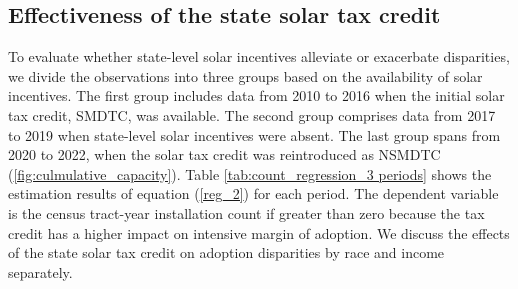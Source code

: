 \documentclass[11pt,twoside,letterpaper]{article}
\begin{document}

\subsection{Effectiveness of the state solar tax credit}

To evaluate whether state-level solar incentives alleviate or exacerbate disparities, we divide the observations into three groups based on the availability of solar incentives. The first group includes data from 2010 to 2016 when the initial solar tax credit, SMDTC, was available. The second group comprises data from 2017 to 2019 when state-level solar incentives were absent. The last group spans from 2020 to 2022, when the solar tax credit was reintroduced as NSMDTC (\autoref{fig:culmulative_capacity}). Table \ref{tab:count_regression_3 periods} shows the estimation results of equation (\ref{reg_2}) for each period. The dependent variable is the census tract-year installation count if greater than zero because the tax credit has a higher impact on intensive margin of adoption. We discuss the effects of the state solar tax credit on adoption disparities by race and income separately.
\end{document}
